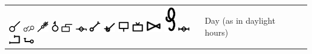 \documentclass[british,final,landscape]{scrartcl}
\begin{document}
\begin{refsection}
\begin{supertabular}{p{0.3\textwidth}p{0.34\textwidth}p{0.34\textwidth}}
   \includegraphics[width=5mm]{Time/Day} \includegraphics[width=5mm]{Time/Day2} \includegraphics[width=5mm]{Time/Day3} \includegraphics[height=5mm]{Time/Day4} \includegraphics[width=5mm]{Time/Day5} \includegraphics[width=5mm]{Time/Day6} \includegraphics[width=5mm]{Time/Day7} \includegraphics[width=5mm]{Time/Day8} \includegraphics[width=5mm]{Time/Day9} \includegraphics[width=5mm]{Time/Day10} \includegraphics[height=5mm]{Time/Day11} \includegraphics[width=5mm]{Time/Day12} \includegraphics[width=5mm]{Time/Day13} \includegraphics[width=5mm]{Time/Day14} \includegraphics[width=5mm]{Time/Day15} & Day (as in daylight hours) & \\

\end{supertabular}
\end{refsection}
\end{document}

